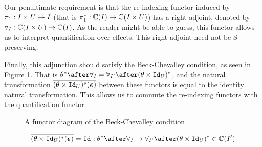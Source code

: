 \documentclass{Report}
\begin{document}
Our penultimate requirement is that the re-indexing functor induced by $\pi_1: I\times U\rightarrow I$ (that is $\pi_1^*: \mathbb{C}(I) \rightarrow \mathbb{C}(I\times U)$) has a right adjoint, denoted by $\forall_I: \mathbb{C}(I\times U) \rightarrow \mathbb{C}(I)$. As the reader might be able to guess, this functor allows us to interpret quantification over effects. This right adjoint need not be S-preserving.

Finally, this adjunction should satisfy the Beck-Chevalley condition, as seen in Figure \ref{BeckChevalleyDiagram}. That is $\theta\star\after\allI = \allII\after(\theta\times\Id{U})\star$, and the natural transformation $\overline{(\theta\times\texttt{Id}_{U})^*(\boldsymbol{\epsilon}_{})}$ between these functors is equal to the identity natural transformation. This allows us to commute the re-indexing functors with the quantification functor.

\begin{figure}
    \begin{framed}
        \centering
    \end{framed}
    \caption{A functor diagram of the Beck-Chevalley condition}
    \label{BeckChevalleyDiagram}
\end{figure}

\begin{align*}
    \bar{(\theta\times\Id{U})\star(\counit{})} = \Id{}: \theta\star\after\allI \rightarrow \allII\after(\theta\times\Id{U})\star\in \C(I')
\end{align*}
\end{document}
